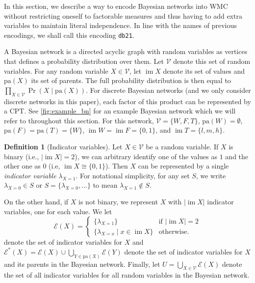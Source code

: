 \documentclass[letterpaper]{article} %
\DeclareMathOperator{\im}{im}
\theoremstyle{definition}
\newtheorem{definition}{Definition}
\theoremstyle{remark}
\begin{document}
{In this section, we describe a way to encode Bayesian networks into WMC without
restricting oneself to factorable measures and thus having to add extra
variables to maintain literal independence. In line with the names of previous
encodings, we shall call this encoding \texttt{db21}.

A Bayesian network is a directed acyclic graph with random variables as vertices
that defines a probability distribution over them. Let $\mathcal{V}$ denote this
set of random variables. For any random variable $X \in \mathcal{V}$, let $\im
X$ denote its set of values and $\mathrm{pa}(X)$ its set of parents. The
full probability distribution is then equal to $\prod_{X \in \mathcal{V}} \Pr(X
\mid \mathrm{pa}(X))$. For discrete Bayesian networks (and we only consider
discrete networks in this paper), each factor of this product can be represented
by a CPT. See \cref{fig:example_bn} for an example Bayesian network which we
will refer to throughout this section. For this network, $\mathcal{V} = \{ W, F,
T \}$, $\mathrm{pa}(W) = \emptyset$, $\mathrm{pa}(F) = \mathrm{pa}(T) = \{ W
\}$, $\im W = \im F = \{0, 1 \}$, and $\im T = \{ l, m, h \}$.

\begin{definition}[Indicator variables]
  Let $X \in \mathcal{V}$ be a random variable. If $X$ is binary (i.e., $|\im X|
  = 2$), we can arbitrary identify one of the values as $1$ and the other one as
  $0$ (i.e, $\im X \cong \{ 0, 1 \}$). Then $X$ can be represented by a single
  \emph{indicator variable} $\lambda_{X=1}$. For notational simplicity, for any
  set $S$, we write $\lambda_{X=0} \in S$ or $S = \{ \lambda_{X=0}, \dots \}$ to
  mean $\lambda_{X=1} \not\in S$.

  On the other hand, if $X$ is not binary, we represent $X$ with $|\im X|$
  indicator variables, one for each value. We let
  \[
    \mathcal{E}(X) = \begin{cases}
      \{ \lambda_{X=1} \} & \text{if } |\im X| = 2 \\
      \{ \lambda_{X=x} \mid x \in \im X \} & \text{otherwise.}
    \end{cases}
  \]
  denote the set of indicator variables for $X$ and $\mathcal{E}^*(X) =
  \mathcal{E}(X) \cup \bigcup_{Y \in \mathrm{pa}(X)} \mathcal{E}(Y)$ denote the
  set of indicator variables for $X$ and its parents in the Bayesian network.
  Finally, let $U = \bigcup_{X \in \mathcal{V}} \mathcal{E}(X)$ denote the set
  of all indicator variables for all random variables in the Bayesian network.
\end{definition}

}
\end{document}
